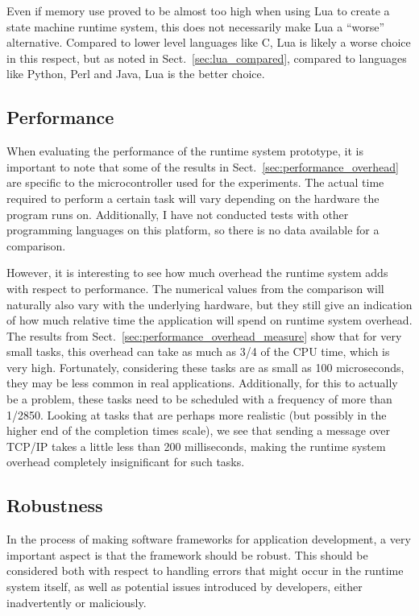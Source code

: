 Even if memory use proved to be almost too high when using Lua to create a state machine runtime system, this does not necessarily make Lua a ``worse'' alternative. Compared to lower level languages like C, Lua is likely a worse choice in this respect, but as noted in Sect.~\ref{sec:lua_compared}, compared to languages like Python, Perl and Java, Lua is the better choice. 

\subsection{Performance}
\label{sec:disq_performance}
When evaluating the performance of the runtime system prototype, it is important to note that some of the results in Sect.~\ref{sec:performance_overhead} are specific to the microcontroller used for the experiments. The actual time required to perform a certain task will vary depending on the hardware the program runs on. Additionally, I have not conducted tests with other programming languages on this platform, so there is no data available for a comparison.

However, it is interesting to see how much overhead the runtime system adds with respect to performance. The numerical values from the comparison will naturally also vary with the underlying hardware, but they still give an indication of how much relative time the application will spend on runtime system overhead. The results from Sect.~\ref{sec:performance_overhead_measure} show that for very small tasks, this overhead can take as much as 3/4 of the CPU time, which is very high. Fortunately, considering these tasks are as small as 100 microseconds, they may be less common in real applications. Additionally, for this to actually be a problem, these tasks need to be scheduled with a frequency of more than 1/2850. Looking at tasks that are perhaps more realistic (but possibly in the higher end of the completion times scale), we see that sending a message over TCP/IP takes a little less than 200 milliseconds, making the runtime system overhead completely insignificant for such tasks.

\subsection{Robustness}
\label{sec:disq_robustness}
In the process of making software frameworks for application development, a very important aspect is that the framework should be robust. This should be considered both with respect to handling errors that might occur in the runtime system itself, as well as potential issues introduced by developers, either inadvertently or maliciously.

